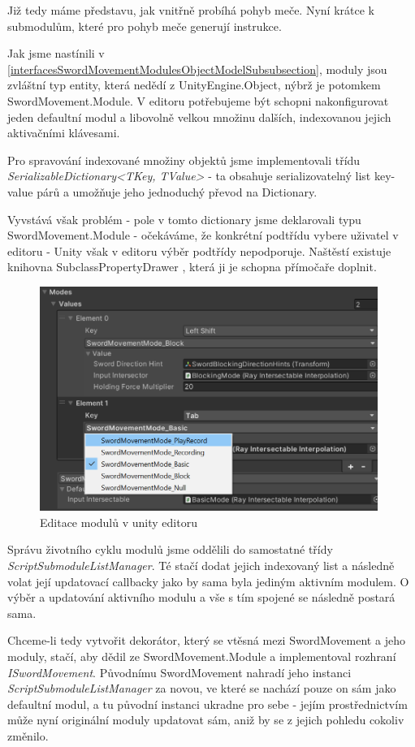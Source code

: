 Již tedy máme představu, jak vnitřně probíhá pohyb meče. Nyní krátce k submodulům, které pro pohyb meče generují instrukce. 

Jak jsme nastínili v \ref{interfacesSwordMovementModulesObjectModelSubsubsection}, moduly jsou zvláštní typ entity, která nedědí z UnityEngine.Object, nýbrž je potomkem SwordMovement.Module. V editoru potřebujeme být schopni nakonfigurovat jeden defaultní modul a libovolně velkou množinu dalších, indexovanou jejich aktivačními klávesami.

Pro spravování indexované množiny objektů jsme implementovali třídu \textit{SerializableDictionary<TKey, TValue>} - ta obsahuje serializovatelný list key-value párů a umožňuje jeho jednoduchý převod na Dictionary. 

Vyvstává však problém - pole v tomto dictionary jsme deklarovali typu SwordMovement.Module - očekáváme, že konkrétní podtřídu vybere uživatel v editoru - Unity však v editoru výběr podtřídy nepodporuje. Naštěstí existuje knihovna SubclassPropertyDrawer \cite{SubclassPropertyDrawer}, která ji je schopna přímočaře doplnit.  

\begin{figure}[ht]\centering
  \center
  \includegraphics[width=110mm]{../img/swordMovementModulesEditor.png}
  \caption{Editace modulů v unity editoru}
  \label{obr05:swordModulePicker}
\end{figure} 

Správu životního cyklu modulů jsme oddělili do samostatné třídy \textit{ScriptSubmoduleListManager}. Té stačí dodat jejich indexovaný list a následně volat její updatovací callbacky jako by sama byla jediným aktivním modulem. O výběr a updatování aktivního modulu a vše s tím spojené se následně postará sama. 

Chceme-li tedy vytvořit dekorátor, který se vtěsná mezi SwordMovement a jeho moduly, stačí, aby dědil ze SwordMovement.Module a implementoval rozhraní \textit{ISwordMovement}. Původnímu SwordMovement nahradí jeho instanci \textit{ScriptSubmoduleListManager} za novou, ve které se nachází pouze on sám jako defaultní modul, a tu původní instanci ukradne pro sebe - jejím prostřednictvím může nyní originální moduly updatovat sám, aniž by se z jejich pohledu cokoliv změnilo.


